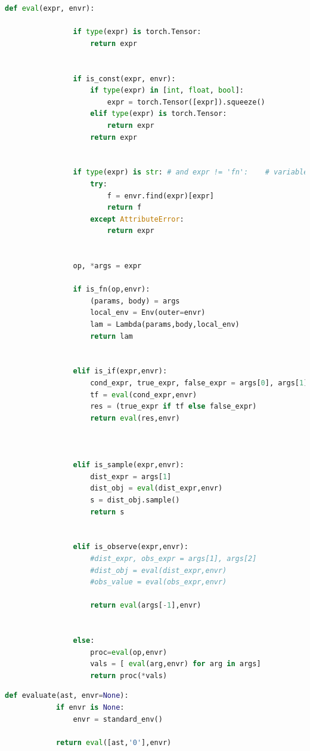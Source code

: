 \documentclass[12pt]{article}%
\theoremstyle{definition}
\begin{document}
		\begin{lstlisting}[language=Python]
		def eval(expr, envr):
		        
		        if type(expr) is torch.Tensor:
		            return expr
		
		
		        if is_const(expr, envr):
		            if type(expr) in [int, float, bool]:
		                expr = torch.Tensor([expr]).squeeze()
		            elif type(expr) is torch.Tensor:
		                return expr
		            return expr
		
		
		        if type(expr) is str: # and expr != 'fn':    # variable reference
		            try:
		                f = envr.find(expr)[expr]
		                return f
		            except AttributeError:
		                return expr
		
		
		        op, *args = expr
		
		        if is_fn(op,envr):
		            (params, body) = args
		            local_env = Env(outer=envr)
		            lam = Lambda(params,body,local_env)
		            return lam
		
		
		        elif is_if(expr,envr):
		            cond_expr, true_expr, false_expr = args[0], args[1], args[2]
		            tf = eval(cond_expr,envr)
		            res = (true_expr if tf else false_expr)
		            return eval(res,envr)

		
		
		        elif is_sample(expr,envr):
		            dist_expr = args[1]
		            dist_obj = eval(dist_expr,envr)
		            s = dist_obj.sample()
		            return s
		
		
		        elif is_observe(expr,envr):     
		            #dist_expr, obs_expr = args[1], args[2]
		            #dist_obj = eval(dist_expr,envr)
		            #obs_value = eval(obs_expr,envr)
		                            
		            return eval(args[-1],envr)
		
		
		        else:
		            proc=eval(op,envr)
		            vals = [ eval(arg,envr) for arg in args]
		            return proc(*vals)
		\end{lstlisting}
		
		\begin{lstlisting}[language=Python]
		def evaluate(ast, envr=None): 
		    if envr is None:
		        envr = standard_env()
		
		    return eval([ast,'0'],envr) 
		\end{lstlisting}
	
	
	
%	
%	
	
	
\end{document}
